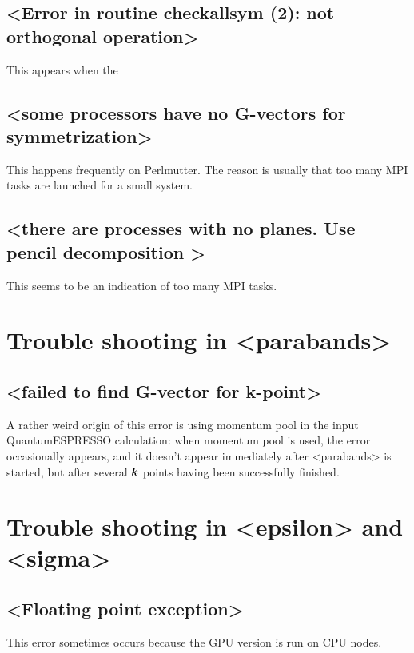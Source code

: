 \documentclass[hyperref, a4paper, 12pt]{report}
\def\texttt#1{<#1>}%
\newcommand{\shortcode}[1]{\texttt{#1}}
\begin{document}
\subsection{\shortcode{Error in routine checkallsym (2): not orthogonal operation}}

This appears when the

\subsection{\shortcode{some processors have no G-vectors for symmetrization}}

This happens frequently on Perlmutter. 
The reason is usually that too many MPI tasks are launched for a small system.

\subsection{\shortcode{there are processes with no planes. Use pencil decomposition }}

This seems to be an indication of too many MPI tasks.

\section{Trouble shooting in \shortcode{parabands}}

\subsection{\shortcode{failed to find G-vector for k-point}}

A rather weird origin of this error 
is using momentum pool in the input QuantumESPRESSO calculation:
when momentum pool is used, 
the error occasionally appears, 
and it doesn't appear immediately after \shortcode{parabands} is started, 
but after several $\vb*{k}$ points having been successfully finished.

\section{Trouble shooting in \shortcode{epsilon} and \shortcode{sigma}}

\subsection{\shortcode{Floating point exception}}

This error sometimes occurs because the GPU version is run on CPU nodes.
\end{document}
